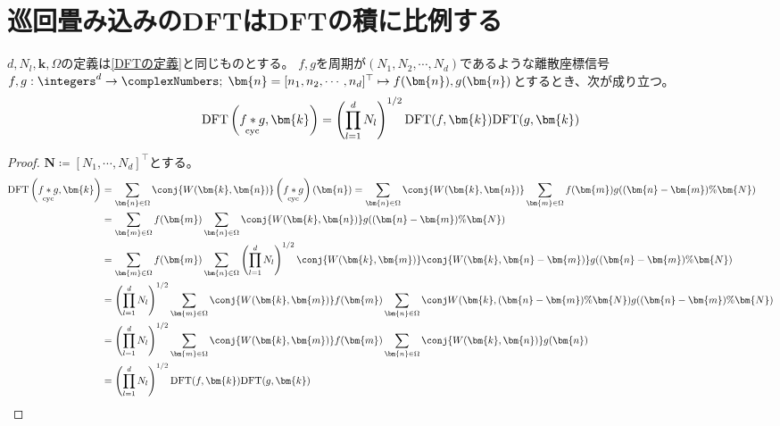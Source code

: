 			\section{巡回畳み込みのDFTはDFTの積に比例する}
				\begin{shadebox}
					$d,N_l,\bm{k},\Omega$の定義は\ref{DFTの定義}と同じものとする。
					$f,g$を周期が$(N_1,N_2,\cdots,N_d)$であるような離散座標信号$f,g: \integers^d\to\complexNumbers;\;\bm{n} = [n_1,n_2,\cdots,n_d]^\top \mapsto f(\bm{n}),g(\bm{n})$とするとき、次が成り立つ。
					\[ \text{DFT}\left(\cycConv{f}{g},\bm{k}\right) = \left(\prod_{l=1}^d N_l\right)^{1/2}\text{DFT}(f,\bm{k})\text{DFT}(g,\bm{k}) \]
				\end{shadebox}
				\begin{proof}
					\quad\par
					$\bm{N} \coloneqq [N_1,\cdots,N_d]^\top$とする。
					\begin{align*}
						\text{DFT}\left(\cycConv{f}{g},\bm{k}\right) &= \sum_{\bm{n}\in\Omega}\conj{W(\bm{k},\bm{n})} \left(\cycConv{f}{g}\right)(\bm{n}) = \sum_{\bm{n}\in\Omega}\conj{W(\bm{k},\bm{n})} \sum_{\bm{m}\in\Omega} f(\bm{m})g((\bm{n}-\bm{m})\%\bm{N}) \\
						&= \sum_{\bm{m}\in\Omega} f(\bm{m}) \sum_{\bm{n}\in\Omega} \conj{W(\bm{k},\bm{n})}g((\bm{n}-\bm{m})\%\bm{N}) \\
						&= \sum_{\bm{m}\in\Omega} f(\bm{m}) \sum_{\bm{n}\in\Omega} \left(\prod_{l=1}^d N_l\right)^{1/2} \conj{W(\bm{k},\bm{m})} \conj{W(\bm{k},\bm{n}-\bm{m})} g((\bm{n}-\bm{m})\%\bm{N}) \\
						&= \left(\prod_{l=1}^d N_l\right)^{1/2} \sum_{\bm{m}\in\Omega} \conj{W(\bm{k},\bm{m})}f(\bm{m}) \sum_{\bm{n}\in\Omega} \conj{W(\bm{k},(\bm{n}-\bm{m})\%\bm{N})} g((\bm{n}-\bm{m})\%\bm{N}) \\
						&= \left(\prod_{l=1}^d N_l\right)^{1/2} \sum_{\bm{m}\in\Omega} \conj{W(\bm{k},\bm{m})}f(\bm{m}) \sum_{\bm{n}\in\Omega} \conj{W(\bm{k},\bm{n})} g(\bm{n}) \\
						&= \left(\prod_{l=1}^d N_l\right)^{1/2}\text{DFT}(f,\bm{k})\text{DFT}(g,\bm{k})
					\end{align*}
				\end{proof}

